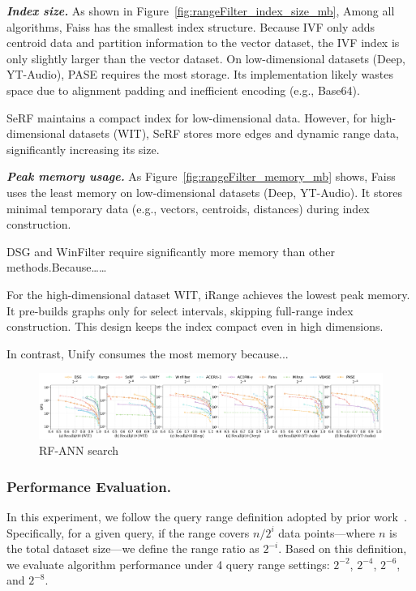 \documentclass[sigconf, nonacm]{acmart}
\begin{document}
	\textit{\textbf{Index size.}} 
	As shown in Figure~\ref{fig:rangeFilter_index_size_mb}, Among all algorithms, Faiss has the smallest index structure. Because IVF only adds centroid data and partition information to the vector dataset, the IVF index is only slightly larger than the vector dataset.
	On low-dimensional datasets (Deep, YT-Audio), PASE requires the most storage. Its implementation likely wastes space due to alignment padding and inefficient encoding (e.g., Base64).
	
	SeRF maintains a compact index for low-dimensional data. However, for high-dimensional datasets (WIT), SeRF stores more edges and dynamic range data, significantly increasing its size.
	
	\textit{\textbf{Peak memory usage.}}
	As Figure~\ref{fig:rangeFilter_memory_mb} shows, Faiss uses the least memory on low-dimensional datasets (Deep, YT-Audio). It stores minimal temporary data (e.g., vectors, centroids, distances) during index construction.
	
	DSG and WinFilter require significantly more memory than other methods.Because……
	
	For the high-dimensional dataset WIT, iRange achieves the lowest peak memory. It pre-builds graphs only for select intervals, skipping full-range index construction. This design keeps the index compact even in high dimensions.
	
	In contrast, Unify consumes the most memory because...
	\begin{figure}[htbp]
		\centering
		\includegraphics[width=\textwidth]{figures/exp/exp_8_2.pdf}
		\caption{RF-ANN search }
		\label{fig:exp_8_2}
	\end{figure}
	
	
	\subsubsection{Performance Evaluation. }
	
	In this experiment, we follow the query range definition adopted by prior work~\cite{HQI}. Specifically, for a given query, if the range covers $n/2^i$ data points—where $n$ is the total dataset size—we define the range ratio as $2^{-i}$. Based on this definition, we evaluate algorithm performance under 4 query range settings: $2^{-2}$, $2^{-4}$, $2^{-6}$, and $2^{-8}$.
	
\end{document}

